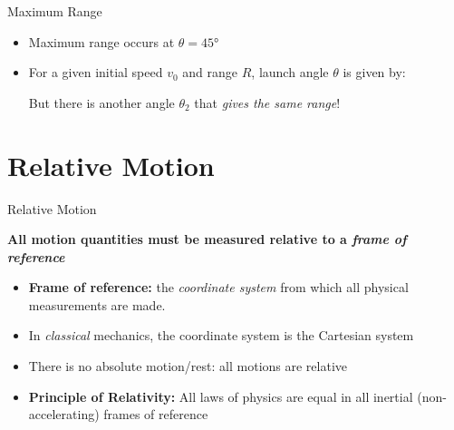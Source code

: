 \documentclass[12pt,compress,aspectratio=169,dvipsnames]{beamer}
\begin{document}
\begin{frame}{Maximum Range}
  
  \begin{itemize}
  \item Maximum range occurs at $\theta=\ang{45}$
  \item For a given initial speed $v_0$ and range $R$, launch angle $\theta$ is
    given by:
    

    But there is another angle $\theta_2$ that \emph{gives the same range}!

  \end{itemize}
\end{frame}



\section{Relative Motion}

\begin{frame}{Relative Motion}
  
  \begin{block}{}
    \textbf{All motion quantities must be measured relative to a
      \emph{frame of reference}}
  \end{block}

  \vspace{.2in}
  \begin{itemize}
  \item\textbf{Frame of reference:} the \emph{coordinate system} from which all
    physical measurements are made.
  \item In \emph{classical} mechanics, the coordinate system is the
    Cartesian system
  \item There is no absolute motion/rest: all motions are relative
  \item\textbf{Principle of Relativity:} All laws of physics are equal in all
    inertial (non-accelerating) frames of reference
  \end{itemize}
\end{frame}  
\end{document}
